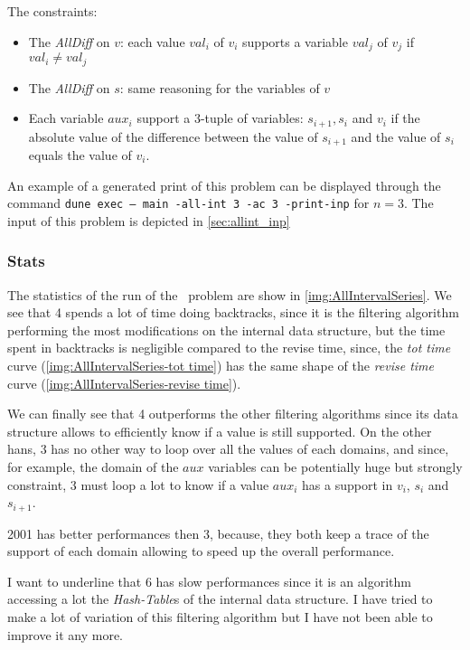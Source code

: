 \documentclass{rapport}
\begin{document}
The constraints:
\begin{itemize}
  \item The \textit{AllDiff} on $v$: each value $val_i$ of $v_i$ supports a variable $val_j$ of $v_j$ if $val_i \neq val_j$
  \item The \textit{AllDiff} on $s$: same reasoning for the variables of $v$
  \item Each variable $aux_i$ support a $3$-tuple of variables: $s_{i+1}, s_i$ and $v_i$ if the absolute value of the difference between the value of $s_{i+1}$ and the value of $s_i$ equals the value of $v_i$.
\end{itemize}

An example of a generated print of this problem can be displayed through the command \texttt{dune exec -- main -all-int 3 -ac 3 -print-inp} for $n = 3$. The input of this problem is depicted in \cref{sec:allint_inp}


\subsubsection{Stats}


The statistics of the run of the \allint\ problem are show in \cref{img:AllIntervalSeries}. We see that \ac{4} spends a lot of time doing backtracks, since it is the filtering algorithm performing the most modifications on the internal data structure, but the time spent in backtracks is negligible compared to the revise time, since, the \textit{tot time} curve (\cref{img:AllIntervalSeries-tot time}) has the same shape of the \textit{revise time} curve (\cref{img:AllIntervalSeries-revise time}).

We can finally see that \ac{4} outperforms the other filtering algorithms since its data structure allows to efficiently know if a value is still supported. On the other hans, \ac{3} has no other way to loop over all the values of each domains, and since, for example, the domain of the $aux$ variables can be potentially huge but strongly constraint, \ac{3} must loop a lot to know if a value $aux_i$ has a support in $v_i$, $s_i$ and $s_{i+1}$.

\ac{2001} has better performances then \ac{3}, because, they both keep a trace of the support of each domain allowing to speed up the overall performance.

I want to underline that \ac{6} has slow performances since it is an algorithm accessing a lot the \textit{Hash-Table}s of the internal data structure. I have tried to make a lot of variation of this filtering algorithm but I have not been able to improve it any more.
\end{document}
